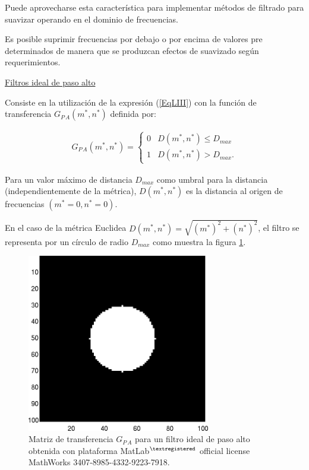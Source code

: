 Puede aprovecharse esta caracter\'istica para implementar m\'etodos de filtrado para suavizar operando en el dominio de frecuencias.
%

%
Es posible suprimir frecuencias por debajo o por encima de valores pre determinados de manera que se produzcan efectos de suavizado seg\'un requerimientos.
%

\begin{center}
\underline{Filtros ideal de paso alto}
\end{center}

Consiste en la utilizaci\'on de la expresi\'on (\ref{EqLIII}) con la funci\'on de transferencia $G_{P\,A}(m^*, n^*)$ definida por:

\begin{eqnarray}
	G_{P\,A}(m^*, n^*) = \left\{ \begin{array}{ll} 
	0 & \mbox{$D(m^*, n^*) \leq D_{max}$}\\
	1 & \mbox{$D(m^*, n^*) > D_{max}$}.\end{array} \right.
\label{EqLXVII}
\end{eqnarray}

Para un valor m\'aximo de distancia $D_{max}$ como umbral para la distancia (independientemente de la m\'etrica), $D(m^*, n^*)$ es la distancia al 
origen de frecuencias $(m^* = 0, n^* = 0)$.
%

%
En el caso de la m\'etrica Euclidea $D(m^*, n^*) = \sqrt{ (m^*)^2 + (n^*)^2}$, el filtro se representa por un c\'irculo de radio $D_{max}$ como
muestra la figura \ref{Fig2_8}.

\vspace{1.0cm}

\begin{center}
\begin{figure} [!h]

\centering
\includegraphics[width=8cm]{Figuras/Fig2_8.png}
   
\caption{Matriz de transferencia $G_{P\,A}$ para un filtro ideal de paso alto 
         obtenida con plataforma MatLab$^{\textregistered}$ official license MathWorks 3407-8985-4332-9223-7918.}
\label{Fig2_8}

\end{figure}
\end{center}


